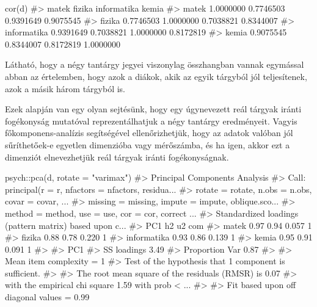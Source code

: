 \documentclass[
  letterpaper,
]{krantz}
\makeatletter
\newenvironment{Shaded}{\begin{snugshade}}{\end{snugshade}}
\newcommand{\AttributeTok}[1]{\textcolor[rgb]{0.40,0.45,0.13}{#1}}
\newcommand{\CommentTok}[1]{\textcolor[rgb]{0.37,0.37,0.37}{#1}}
\newcommand{\FunctionTok}[1]{\textcolor[rgb]{0.28,0.35,0.67}{#1}}
\newcommand{\NormalTok}[1]{\textcolor[rgb]{0.00,0.23,0.31}{#1}}
\newcommand{\SpecialCharTok}[1]{\textcolor[rgb]{0.37,0.37,0.37}{#1}}
\newcommand{\StringTok}[1]{\textcolor[rgb]{0.13,0.47,0.30}{#1}}
\newenvironment{kframe}{%
\medskip{}
\setlength{\fboxsep}{.8em}
 \def\at@end@of@kframe{}%
 \ifinner\ifhmode%
  \def\at@end@of@kframe{\end{minipage}}%
  \begin{minipage}{\columnwidth}%
 \fi\fi%
 \def\FrameCommand##1{\hskip\@totalleftmargin \hskip-\fboxsep
 \colorbox{shadecolor}{##1}\hskip-\fboxsep
     \hskip-\linewidth \hskip-\@totalleftmargin \hskip\columnwidth}%
 \MakeFramed {\advance\hsize-\width
   \@totalleftmargin\z@ \linewidth\hsize
   \@setminipage}}%
 {\par\unskip\endMakeFramed%
 \at@end@of@kframe}
\renewenvironment{Shaded}{\begin{kframe}}{\end{kframe}}
\makeatother
\begin{document}
\begin{Shaded}
\begin{Highlighting}[]
\FunctionTok{cor}\NormalTok{(d)}
\CommentTok{\#\textgreater{}                 matek    fizika informatika     kemia}
\CommentTok{\#\textgreater{} matek       1.0000000 0.7746503   0.9391649 0.9075545}
\CommentTok{\#\textgreater{} fizika      0.7746503 1.0000000   0.7038821 0.8344007}
\CommentTok{\#\textgreater{} informatika 0.9391649 0.7038821   1.0000000 0.8172819}
\CommentTok{\#\textgreater{} kemia       0.9075545 0.8344007   0.8172819 1.0000000}
\end{Highlighting}
\end{Shaded}

Látható, hogy a négy tantárgy jegyei viszonylag összhangban vannak
egymással abban az értelemben, hogy azok a diákok, akik az egyik
tárgyból jól teljesítenek, azok a másik három tárgyból is.

Ezek alapján van egy olyan sejtésünk, hogy egy úgynevezett reál tárgyak
iránti fogékonyság mutatóval reprezentálhatjuk a négy tantárgy
eredményeit. Vagyis főkomponens-analízis segítségével ellenőrizhetjük,
hogy az adatok valóban jól sűríthetőek-e egyetlen dimenzióba vagy
mérőszámba, és ha igen, akkor ezt a dimenziót elnevezhetjük reál tárgyak
iránti fogékonyságnak.

\begin{Shaded}
\begin{Highlighting}[]
\NormalTok{psych}\SpecialCharTok{::}\FunctionTok{pca}\NormalTok{(d, }\AttributeTok{rotate =} \StringTok{"varimax"}\NormalTok{)}
\CommentTok{\#\textgreater{} Principal Components Analysis}
\CommentTok{\#\textgreater{} Call: principal(r = r, nfactors = nfactors, residua...}
\CommentTok{\#\textgreater{}     rotate = rotate, n.obs = n.obs, covar = covar, ...}
\CommentTok{\#\textgreater{}     missing = missing, impute = impute, oblique.sco...}
\CommentTok{\#\textgreater{}     method = method, use = use, cor = cor, correct ...}
\CommentTok{\#\textgreater{} Standardized loadings (pattern matrix) based upon c...}
\CommentTok{\#\textgreater{}              PC1   h2    u2 com}
\CommentTok{\#\textgreater{} matek       0.97 0.94 0.057   1}
\CommentTok{\#\textgreater{} fizika      0.88 0.78 0.220   1}
\CommentTok{\#\textgreater{} informatika 0.93 0.86 0.139   1}
\CommentTok{\#\textgreater{} kemia       0.95 0.91 0.091   1}
\CommentTok{\#\textgreater{} }
\CommentTok{\#\textgreater{}                 PC1}
\CommentTok{\#\textgreater{} SS loadings    3.49}
\CommentTok{\#\textgreater{} Proportion Var 0.87}
\CommentTok{\#\textgreater{} }
\CommentTok{\#\textgreater{} Mean item complexity =  1}
\CommentTok{\#\textgreater{} Test of the hypothesis that 1 component is sufficient.}
\CommentTok{\#\textgreater{} }
\CommentTok{\#\textgreater{} The root mean square of the residuals (RMSR) is  0.07 }
\CommentTok{\#\textgreater{}  with the empirical chi square  1.59  with prob \textless{}  ...}
\CommentTok{\#\textgreater{} }
\CommentTok{\#\textgreater{} Fit based upon off diagonal values = 0.99}
\end{Highlighting}
\end{Shaded}
\end{document}
